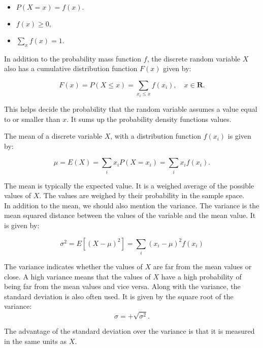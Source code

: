\begin{itemize}
	\item $P(X = x) = f(x).$
	\item $f(x) \geq 0,$
	\item $\sum_x f(x) = 1.$
\end{itemize}

\noindent In addition to the probability mass function $f$, the discrete random variable $X$ also has a cumulative distribution function $F(x)$ given by:

\begin{equation}
F(x) = P(X \leq x) = \sum_{x_i \leq x} f(x_i), \quad x \in \textbf{R}.
\end{equation}


\noindent This helps decide the probability that the random variable assumes a value equal to or smaller than $x$. It sums up the probability density functions values.
\newline

\noindent The mean of a discrete variable $X$, with a distribution function $f(x_{i})$ is given by:

\begin{equation}
\mu = E(X) = \sum_i x_i P(X = x_i) = \sum_i x_i f(x_i).
\end{equation}

\noindent The mean is typically the expected value. It is a weighed average of the possible values of $X$. The values are weighed by their probability in the sample space.
\\

\noindent In addition to the mean, we should also mention the variance. The variance is the mean squared distance between the values of the variable and the mean value. It is given by:

\begin{equation}
\sigma^2 = E\left[(X - \mu)^2\right] = \sum_{i} (x_i - \mu)^2 f(x_i)
\end{equation}

\noindent The variance indicates whether the values of $X$ are far from the mean values or close. A high variance means that the values of $X$ have a high probability of being far from the mean values and vice versa. Along with the variance, the standard deviation is also often used. It is given by the square root of the variance:
\begin{equation}
\sigma=+\sqrt{\sigma^2}.
\end{equation}

\noindent The advantage of the standard deviation over the variance is that it is measured in the same units as $X$.

